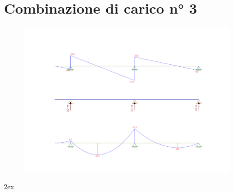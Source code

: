\documentclass[a4paper,12pt, oneside]{book}
\begin{document}
    \break
    
    \section{Combinazione di carico n° 3}

    \begin{figure}[H]
    	\hspace*{-3.7cm}\includegraphics[width=1.5\linewidth]{"immagini/caso 3.png"}
    \end{figure}






	\newpage
	\begingroup
	\parindent 0pt
	\parskip 2ex
	\def\enotesize{\normalsize}
	\theendnotes
	\endgroup
\end{document}

